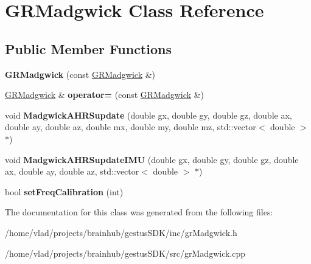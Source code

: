\hypertarget{classGRMadgwick}{}\section{G\+R\+Madgwick Class Reference}
\label{classGRMadgwick}
\subsection*{Public Member Functions}
\begin{DoxyCompactItemize}
\item 
\mbox{\label{classGRMadgwick_abb56985d4f31d3a19072df3c4c68d747}} 
{\bfseries G\+R\+Madgwick} (const \mbox{\hyperlink{classGRMadgwick}{G\+R\+Madgwick}} \&)
\item 
\mbox{\label{classGRMadgwick_a589fce4426a70c9a2a9808b66c00ec5e}} 
\mbox{\hyperlink{classGRMadgwick}{G\+R\+Madgwick}} \& {\bfseries operator=} (const \mbox{\hyperlink{classGRMadgwick}{G\+R\+Madgwick}} \&)
\item 
\mbox{\label{classGRMadgwick_a3975b7b1fb251e9cc05ee0817c7a9179}} 
void {\bfseries Madgwick\+A\+H\+R\+Supdate} (double gx, double gy, double gz, double ax, double ay, double az, double mx, double my, double mz, std\+::vector$<$ double $>$ $\ast$)
\item 
\mbox{\label{classGRMadgwick_a23586708a657d6b168facbd9e21571c8}} 
void {\bfseries Madgwick\+A\+H\+R\+Supdate\+I\+MU} (double gx, double gy, double gz, double ax, double ay, double az, std\+::vector$<$ double $>$ $\ast$)
\item 
\mbox{\label{classGRMadgwick_ab38270f0bf98485f700bebb8df813d1c}} 
bool {\bfseries set\+Freq\+Calibration} (int)
\end{DoxyCompactItemize}


The documentation for this class was generated from the following files\+:\begin{DoxyCompactItemize}
\item 
/home/vlad/projects/brainhub/gestus\+S\+D\+K/inc/gr\+Madgwick.\+h\item 
/home/vlad/projects/brainhub/gestus\+S\+D\+K/src/gr\+Madgwick.\+cpp\end{DoxyCompactItemize}
